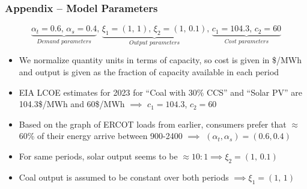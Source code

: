 \documentclass[aspectratio=169]{beamer}
\begin{document}
	\begin{frame}
		\frametitle{Appendix -- Model Parameters}
		
		$$\underbrace{\alpha_t = 0.6, \,\alpha_s = 0.4}_{Demand\,\,parameters}, \,\underbrace{\xi_1 = (1, \, 1), \,\xi_2 = (1, \, 0.1)}_{Output\,\,parameters}, \,\underbrace{c_1 = 104.3, \,c_2 = 60}_{Cost \,\, parameters}$$
		
		\begin{itemize}
			\setlength\itemsep{0.5em}
			\item We normalize quantity units in terms of capacity, so cost is given in \$/MWh and output is given as the fraction of capacity available in each period
			\item EIA LCOE estimates for 2023 for ``Coal with 30\% CCS'' and ``Solar PV''  are 104.3\$/MWh and 60\$/MWh $\implies$ $c_1 = 104.3$, $c_2 = 60$
			\item Based on the graph of ERCOT loads from earlier, consumers prefer that $\approx$ 60\% of their energy arrive between 900-2400 $\implies$ $(\alpha_t, \alpha_s) = (0.6, 0.4)$
			\item For same periods, solar output seems to be $\approx 10:1 \implies \xi_2 = (1, \, 0.1)$
			\item Coal output is assumed to be constant over both periods $\implies \xi_1 = (1, \, 1)$
		\end{itemize}
		
	\end{frame}
	
\end{document}
